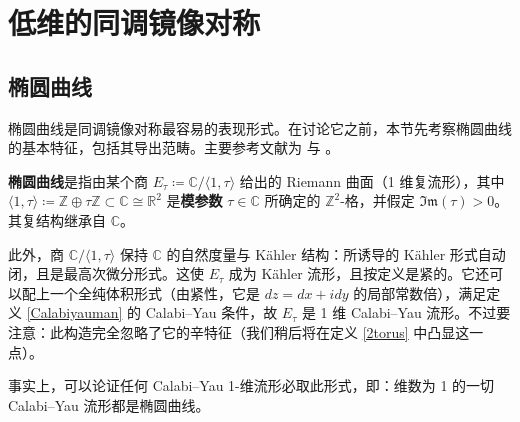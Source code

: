 \section{低维的同调镜像对称}
\thispagestyle{plain}


\subsection{椭圆曲线}\label{ch7.1}


椭圆曲线是同调镜像对称最容易的表现形式。在讨论它之前，本节先考察椭圆曲线的基本特征，包括其导出范畴。主要参考文献为 \cite{[Kre00]} 与 \cite{[Por15]}。

\begin{Def}\label{ellipticcurve}
	\textbf{椭圆曲线}是指由某个商 $E_\tau\coloneqq\mathbb{C}/\langle 1,\tau\rangle$ 给出的 Riemann 曲面（1 维复流形），其中 $\langle 1,\tau\rangle\coloneqq\mathbb{Z}\oplus\tau\mathbb{Z}\subset\mathbb{C}\cong\mathbb{R}^2$ 是\textbf{模参数} $\tau\in\mathbb{C}$ 所确定的 $\mathbb{Z}^2$-格，并假定 $\mathfrak{Im}(\tau)>0$。其复结构继承自 $\mathbb{C}$。

	此外，商 $\mathbb{C}/\langle 1,\tau\rangle$ 保持 $\mathbb{C}$ 的自然度量与 Kähler 结构：所诱导的 Kähler 形式自动闭，且是最高次微分形式。这使 $E_\tau$ 成为 Kähler 流形，且按定义是紧的。它还可以配上一个全纯体积形式（由紧性，它是 $dz=dx+idy$ 的局部常数倍），满足定义 \ref{Calabiyauman} 的 Calabi--Yau 条件，故 $E_\tau$ 是 1 维 Calabi--Yau 流形。不过要注意：此构造完全忽略了它的辛特征（我们稍后将在定义 \ref{2torus} 中凸显这一点）。

	事实上，可以论证任何 Calabi--Yau 1-维流形必取此形式，即：维数为 1 的一切 Calabi--Yau 流形都是椭圆曲线。
\end{Def}

